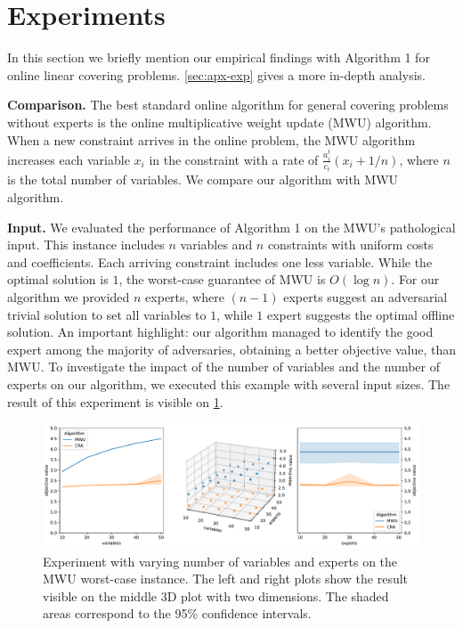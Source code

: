 
\section{Experiments} \label{sec:exp}

In this section we briefly mention our empirical findings with Algorithm  1 for online linear covering problems. \cref{sec:apx-exp} gives a more in-depth analysis.

\textbf{Comparison.} The best standard online algorithm for general covering problems without experts is the online multiplicative weight update (MWU) algorithm. When a new constraint arrives in the online problem, the MWU algorithm increases each variable $x_i$ in the constraint with a rate of $\frac{a^t_i}{c_i}(x_i + 1/n)$, where $n$ is the total number of variables. We compare our algorithm with MWU algorithm.

\textbf{Input.} We evaluated the performance of Algorithm 1 on the MWU's pathological input. This instance includes $n$ variables and $n$ constraints with uniform costs and coefficients. Each arriving constraint includes one less variable. While the optimal solution is $1$, the worst-case guarantee of MWU is $O(\log n)$. For our algorithm we provided $n$ experts, where $(n-1)$ experts suggest an adversarial trivial solution to set all variables to $1$, while $1$ expert suggests the optimal offline solution. An important highlight: our algorithm managed to identify the good expert among the majority of adversaries, obtaining a better objective value, than MWU. To investigate the impact of the number of variables and the number of experts on our algorithm, we executed this example with several input sizes. The result of this experiment is visible on \cref{fig:exp-3d}.

\begin{figure}[!ht]
    \centering
    \includegraphics[width=\linewidth]{../paper/Img/worst_case_figure.pdf}
    \caption{Experiment with varying number of variables and experts on the MWU worst-case instance. The left and right plots show the result visible on the middle 3D plot with two dimensions. The shaded areas correspond to the 95\% confidence intervals.}
    \label{fig:exp-3d}
\end{figure}
